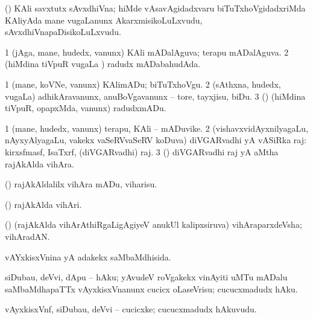 \bentry
{} 
\gl{\nA}
\expl{}
\bmng
 (\birx) KAli savxtutx sAvxdhiVna; hiMde vAsavAgidadxvaru biTuTxhoVgidadxriMda KAliyAda mane \mo vugaLanunx AkarxmisikoLuLxvudu, sAvxdhiVnapaDisikoLuLxvudu. 
\emng
\eentry

\bentry
{} 
\gl{\gu}
\expl{}
\bmng
\bnum
\num{1} (jAga, mane, hudedx, \mo vanunx) KAli mADalAguva; terapu mADalAguva. 
\num{2} (hiMdina tiVpuR \mo vugaLa \vi) radudx mADabahudAda. 
\enum
\emng
\eentry

\bentry
{} 
\gl{\sakirx}
\expl{}
\bmng
\bnum
\num{1} (mane, koVNe, \mo vanunx) KAlimADu; biTuTxhoVgu. 
\num{2} (sAthxna, hudedx, \mo vugaLa) adhikAravanunx, anuBoVgavanunx -- tore, tayxjisu, biDu. 
\num{3} (\nAyxshA) (hiMdina tiVpuR, opapxMda, \mo vanunx) radudxmADu. 
\enum
\emng
\eentry

\bentry
{} 
\gl{\nA}
\expl{}
\bmng
\bnum
\num{1} (mane, hudedx, \mo vanunx) terapu, KAli -- mADuvike. 
\num{2} (vishavxvidAyxnilyagaLu, nAyxyAlyagaLu, \mo vakekx vaSeRVvaSeRV koDuva) diVGARvadhi yA vASiRka raj: kirxsfmasf, IsaTxrf, \mo (diVGARvadhi) raj. 
\num{3} (\ame) diVGARvadhi raj yA aMtha rajAkAlda vihAra. 
\enum
\emng
\eentry
 
\bentry
{} 
\gl{\akirx}
\expl{}
\bmng
 (\ame) rajAkAldalilx vihAra mADu, viharisu. 
\emng
\eentry

\bentry
{} 
\gl{\nA}
\expl{}
\bmng
\emng
\eentry

\bentry
{} 
\gl{\nA}
\expl{}
\bmng
 (\ame) rajAkAlda vihAri. 
\emng
\eentry

\bentry
{}
\gl{\nA}
\expl{}
\bmng
 (\ame) (rajAkAlda vihArAthiRgaLigAgiyeV anukUl kalipxsiruva) vihAraparxdeVsha; vihAradAN. 
\emng
\eentry

\bentry
{} 
\gl{\gu}
\expl{}
\bmng
 vAYxkisxVnina yA adakekx saMbaMdhisida. 
\emng
\eentry

\bentry
{} 
\gl{\sakirx}
\expl{}
\bmng
 siDubau, deVvi, dApu -- hAku; yAvudeV roVgakekx vinAyiti uMTu mADalu saMbaMdhapaTTx vAyxkisxVnanunx cucicx oLaseVrisu; cucucxmadudx hAku. 
\emng
\eentry

\bentry
{} 
\gl{\nA}
\expl{}
\bmng
 vAyxkisxVnf, siDubau, deVvi -- cucicxke; cucucxmadudx hAkuvudu. 
\emng
\eentry

